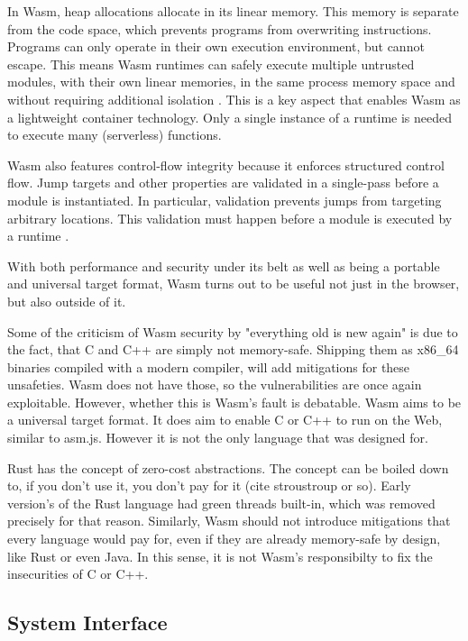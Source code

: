 In Wasm, heap allocations allocate in its linear memory. This memory is separate from the code space, which prevents programs from overwriting instructions. Programs can only operate in their own execution environment, but cannot escape. This means Wasm runtimes can safely execute multiple untrusted modules, with their own linear memories, in the same process memory space and without requiring additional isolation \cite{Haas2017}. This is a key aspect that enables Wasm as a lightweight container technology. Only a single instance of a runtime is needed to execute many (serverless) functions.

Wasm also features control-flow integrity because it enforces structured control flow. Jump targets and other properties are validated in a single-pass before a module is instantiated. In particular, validation prevents jumps from targeting arbitrary locations. This validation must happen before a module is executed by a runtime \cite{Haas2017}.

With both performance and security under its belt as well as being a portable and universal target format, Wasm turns out to be useful not just in the browser, but also outside of it.

Some of the criticism of Wasm security by "everything old is new again" is due to the fact, that C and C++ are simply not memory-safe. Shipping them as x86\_64 binaries compiled with a modern compiler, will add mitigations for these unsafeties. Wasm does not have those, so the vulnerabilities are once again exploitable. However, whether this is Wasm's fault is debatable. Wasm aims to be a universal target format. It does aim to enable C or C++ to run on the Web, similar to asm.js. However it is not the only language that was designed for.

Rust has the concept of zero-cost abstractions. The concept can be boiled down to, if you don't use it, you don't pay for it (cite stroustroup or so). Early version's of the Rust language had green threads built-in, which was removed precisely for that reason. Similarly, Wasm should not introduce mitigations that every language would pay for, even if they are already memory-safe by design, like Rust or even Java. In this sense, it is not Wasm's responsibilty to fix the insecurities of C or C++.

\subsection{System Interface}

